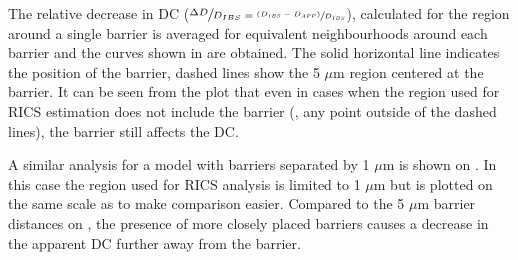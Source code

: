 The relative decrease in \ac{DC} ($\sfrac{\Delta
D}{D_{IBS}=\sfrac{(D_{IBS}-D_{APP})}{D_{IBS}}}$), calculated for the region around a single barrier
is averaged for equivalent neighbourhoods around each barrier and the curves shown in
 are obtained.
The solid horizontal line indicates the position of the barrier, dashed lines show the 5 $\mu$m
region centered at the barrier. It can be seen from the plot that even
in cases when the region used for \ac{RICS} estimation does not include
the barrier (\ie, any point outside of the dashed lines), the barrier
still affects the \ac{DC}. 

A similar analysis for a model with barriers
separated by 1 $\mu$m is shown on . In this case
the region used for \ac{RICS} analysis is limited to 1 $\mu$m but is plotted on the same scale
as  to make comparison easier. Compared to the
5 $\mu$m barrier distances on , the presence of 
more closely placed barriers causes a decrease in the apparent \ac{DC}
further away from the barrier.

